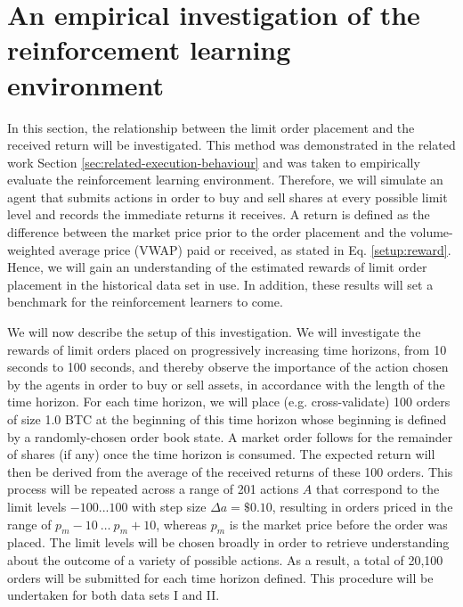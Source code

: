 \section{An empirical investigation of the reinforcement learning environment}
\label{sec:eval-empirical}
In this section, the relationship between the limit order placement and the received return will be investigated.
This method was demonstrated in the related work Section \ref{sec:related-execution-behaviour} and was taken to empirically evaluate the reinforcement learning environment.
Therefore, we will simulate an agent that submits actions in order to buy and sell shares at every possible limit level and records the immediate returns it receives.
A return is defined as the difference between the market price prior to the order placement and the volume- weighted average price (VWAP) paid or received, as stated in Eq. \ref{setup:reward}.
Hence, we will gain an understanding of the estimated rewards of limit order placement in the historical data set in use.
In addition, these results will set a benchmark for the reinforcement learners to come.

We will now describe the setup of this investigation.
We will investigate the rewards of limit orders placed on progressively increasing time horizons, from 10 seconds to 100 seconds, and thereby observe the importance of the action chosen by the agents in order to buy or sell assets, in accordance with the length of the time horizon.
For each time horizon, we will place (e.g. cross-validate) 100 orders of size 1.0 BTC at the beginning of this time horizon whose beginning is defined by a randomly-chosen order book state. 
A market order follows for the remainder of shares (if any) once the time horizon is consumed.
The expected return will then be derived from the average of the received returns of these 100 orders.
This process will be repeated across a range of 201 actions $A$ that correspond to the limit levels $-100...100$ with step size $\Delta{a} = \$0.10$, resulting in orders priced in the range of $p_m-10 \ \dots \ p_m+10$, whereas $p_m$ is the market price before the order was placed.
The limit levels will be chosen broadly in order to retrieve understanding about the outcome of a variety of possible actions.
As a result, a total of 20,100 orders will be submitted for each time horizon defined.
This procedure will be undertaken for both data sets I and II.

